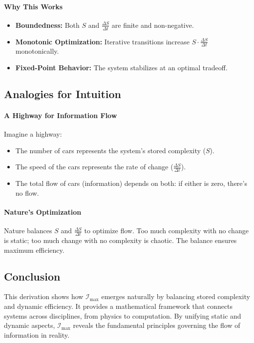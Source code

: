 \documentclass[12pt]{article}
\begin{document}
\paragraph{Why This Works}
\begin{itemize}
    \item \textbf{Boundedness:} Both \(S\) and \(\frac{\Delta S}{\Delta t}\) are finite and non-negative.
    \item \textbf{Monotonic Optimization:} Iterative transitions increase \(S \cdot \frac{\Delta S}{\Delta t}\) monotonically.
    \item \textbf{Fixed-Point Behavior:} The system stabilizes at an optimal tradeoff.
\end{itemize}


\subsection{Analogies for Intuition}

\paragraph{A Highway for Information Flow}
Imagine a highway:
\begin{itemize}
    \item The number of cars represents the system’s stored complexity (\(S\)).
    \item The speed of the cars represents the rate of change (\(\frac{\Delta S}{\Delta t}\)).
    \item The total flow of cars (information) depends on both: if either is zero, there’s no flow.
\end{itemize}

\paragraph{Nature’s Optimization}
Nature balances \(S\) and \(\frac{\Delta S}{\Delta t}\) to optimize flow. Too much complexity with no change is static; too much change with no complexity is chaotic. The balance ensures maximum efficiency.

\subsection{Conclusion}
This derivation shows how \(\mathcal{I}_{\text{max}}\) emerges naturally by balancing stored complexity and dynamic efficiency. It provides a mathematical framework that connects systems across disciplines, from physics to computation. By unifying static and dynamic aspects, \(\mathcal{I}_{\text{max}}\) reveals the fundamental principles governing the flow of information in reality.
\end{document}
